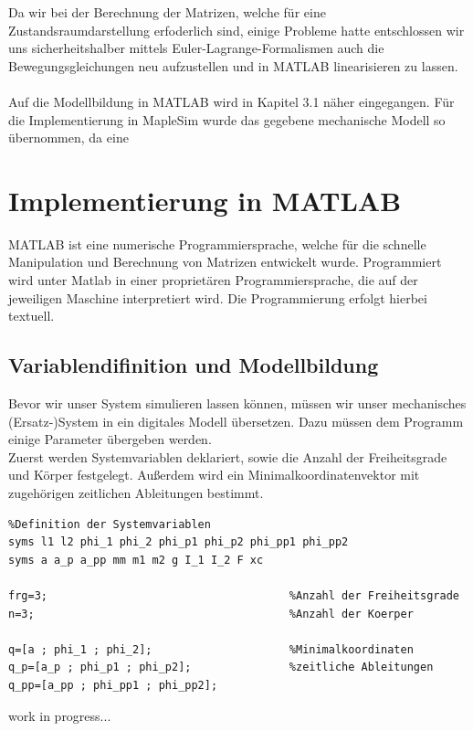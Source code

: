 \documentclass[a4paper, 10pt]{report}
\begin{document}
Da wir bei der Berechnung der Matrizen, welche für eine Zustandsraumdarstellung erfoderlich sind, einige Probleme hatte entschlossen wir uns sicherheitshalber mittels Euler-Lagrange-Formalismen auch die Bewegungsgleichungen neu aufzustellen und in MATLAB linearisieren zu lassen. 
 \\
\\ 
Auf die Modellbildung in MATLAB wird in Kapitel 3.1 näher eingegangen. Für die Implementierung in MapleSim wurde das gegebene mechanische Modell so übernommen, da eine 
	


\renewcommand{\thechapter}{}
\chapter{Implementierung in MATLAB}
\renewcommand{\thechapter}{3}
%
%
MATLAB ist eine numerische Programmiersprache, welche für die schnelle Manipulation und Berechnung von Matrizen entwickelt wurde. Programmiert wird unter Matlab in einer proprietären Programmiersprache, die auf der jeweiligen Maschine interpretiert wird. Die Programmierung erfolgt hierbei textuell.

 \section{Variablendifinition und Modellbildung}
Bevor wir unser System simulieren lassen können, müssen wir unser mechanisches (Ersatz-)System in ein digitales Modell übersetzen. Dazu müssen dem Programm einige Parameter übergeben werden.\\
 Zuerst werden Systemvariablen deklariert, sowie die Anzahl der Freiheitsgrade und Körper festgelegt. Außerdem wird ein Minimalkoordinatenvektor mit zugehörigen zeitlichen Ableitungen bestimmt.

\begin{lstlisting}
%Definition der Systemvariablen
syms l1 l2 phi_1 phi_2 phi_p1 phi_p2 phi_pp1 phi_pp2
syms a a_p a_pp mm m1 m2 g I_1 I_2 F xc

frg=3;                                     %Anzahl der Freiheitsgrade
n=3;                                       %Anzahl der Koerper

q=[a ; phi_1 ; phi_2];                     %Minimalkoordinaten
q_p=[a_p ; phi_p1 ; phi_p2];               %zeitliche Ableitungen
q_pp=[a_pp ; phi_pp1 ; phi_pp2];
\end{lstlisting}
 work in progress...
\end{document}
